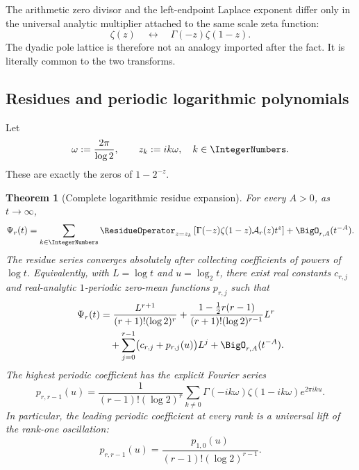 \documentclass[11pt,oneside]{article}
\newtheorem{theorem}{Theorem}[section]
\theoremstyle{definition}
\theoremstyle{remark}
\begin{document}
\begin{resultbox}
The arithmetic zero divisor and the left-endpoint Laplace exponent differ only in the universal analytic multiplier attached to the same scale zeta function:
\[
 \zeta(z)\quad\longleftrightarrow\quad\Gamma(-z)\zeta(1-z).
\]
The dyadic pole lattice is therefore not an analogy imported after the fact.  It is literally common to the two transforms.
\end{resultbox}

\subsection{Residues and periodic logarithmic polynomials}

Let
\begin{equation}\label{p3:eq:omega-zk}
  \omega:=\frac{2\pi}{\log2},
  \qquad z_k:=ik\omega,\quad k\in\IntegerNumbers.
\end{equation}
These are exactly the zeros of $1-2^{-z}$.

\begin{theorem}[Complete logarithmic residue expansion]\label{p3:thm:residue-expansion}
For every $A>0$, as $t\to\infty$,
\begin{equation}\label{p3:eq:residue-sum}
 \Psi_r(t)=\sum_{k\in\IntegerNumbers}
 \ResidueOperator_{z=z_k}\left[
 \Gamma(-z)\zeta(1-z)\mathcal A_r(z)t^z
 \right]+\BigO_{r,A}(t^{-A}).
\end{equation}
The residue series converges absolutely after collecting coefficients of powers of $\log t$.  Equivalently, with $L=\log t$ and $u=\log_2t$, there exist real constants $c_{r,j}$ and real-analytic $1$-periodic zero-mean functions $p_{r,j}$ such that
\begin{align}
 \Psi_r(t)
 &=\frac{L^{r+1}}{(r+1)!(\log2)^r}
 +\frac{1-\frac12r(r-1)}{(r+1)!(\log2)^{r-1}}L^r\notag\\
 &\quad+\sum_{j=0}^{r-1}
 \bigl(c_{r,j}+p_{r,j}(u)\bigr)L^j
 +\BigO_{r,A}(t^{-A}).\label{p3:eq:Psi-periodic-polynomial}
\end{align}
The highest periodic coefficient has the explicit Fourier series
\begin{equation}\label{p3:eq:top-periodic-coefficient}
 p_{r,r-1}(u)=
 \frac1{(r-1)!(\log2)^r}
 \sum_{k\ne0}
 \Gamma(-ik\omega)\zeta(1-ik\omega)e^{2\pi iku}.
\end{equation}
In particular, the leading periodic coefficient at every rank is a universal lift of the rank-one oscillation:
\begin{equation}\label{p3:eq:universal-periodic-lift}
  p_{r,r-1}(u)=
  \frac{p_{1,0}(u)}{(r-1)!(\log2)^{r-1}}.
\end{equation}
\end{theorem}
\end{document}
